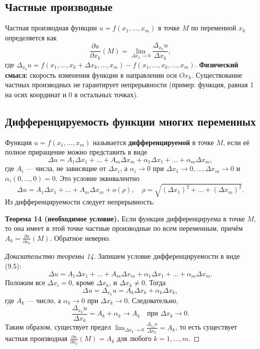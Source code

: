 \documentclass{article}
\theoremstyle{definition}
\begin{document}
\subsection{Частные производные}
Частная производная функции $u=f(x_1,\dots,x_m)$ в точке $M$ по переменной $x_k$ определяется как
\[
\frac{\partial u}{\partial x_k}(M)=\lim_{\Delta x_k\to0}\frac{\Delta_{x_k}u}{\Delta x_k},
\]
где $\Delta_{x_k}u=f(x_1,\dots,x_k+\Delta x_k,\dots,x_m)-f(x_1,\dots,x_k,\dots,x_m)$.
\textbf{Физический смысл:} скорость изменения функции в направлении оси $Ox_k$.
Существование частных производных не гарантирует непрерывности (пример: функция, равная 1 на осях координат и 0 в остальных точках).

\subsection{Дифференцируемость функции многих переменных}
Функция $u=f(x_1,\dots,x_m)$ называется \textbf{дифференцируемой} в точке $M$, если её полное приращение можно представить в виде
\[
\Delta u = A_1\Delta x_1+\dots+A_m\Delta x_m + \alpha_1\Delta x_1+\dots+\alpha_m\Delta x_m,
\]
где $A_i$ — числа, не зависящие от $\Delta x_i$, а $\alpha_i\to0$ при $\Delta x_1\to0,\dots,\Delta x_m\to0$ и $\alpha_i(0,\dots,0)=0$. Это условие эквивалентно
\[
\Delta u = A_1\Delta x_1+\dots+A_m\Delta x_m + o(\rho),\quad \rho=\sqrt{(\Delta x_1)^2+\dots+(\Delta x_m)^2}.
\]
Из дифференцируемости следует непрерывность.

\textbf{Теорема 14 (необходимое условие).} Если функция дифференцируема в точке $M$, то она имеет в этой точке частные производные по всем переменным, причём $A_k=\frac{\partial u}{\partial x_k}(M)$.
Обратное неверно.

\begin{proof}[Доказательство теоремы 14]
Запишем условие дифференцируемости в виде (9.5):
\[
\Delta u = A_1\Delta x_1 + \dots + A_m\Delta x_m + \alpha_1\Delta x_1 + \dots + \alpha_m\Delta x_m.
\]
Положим все $\Delta x_i = 0$, кроме $\Delta x_k$, и $\Delta x_k \neq 0$. Тогда
\[
\Delta u = \Delta_{x_k}u = A_k\Delta x_k + \alpha_k\Delta x_k,
\]
где $A_k$ — число, а $\alpha_k \to 0$ при $\Delta x_k \to 0$. Следовательно,
\[
\frac{\Delta_{x_k}u}{\Delta x_k} = A_k + \alpha_k \to A_k \quad \text{при } \Delta x_k \to 0.
\]
Таким образом, существует предел $\lim_{\Delta x_k\to0}\frac{\Delta_{x_k}u}{\Delta x_k} = A_k$, то есть существует частная производная $\frac{\partial u}{\partial x_k}(M) = A_k$ для любого $k=1,\dots,m$.
\end{proof}
\end{document}
